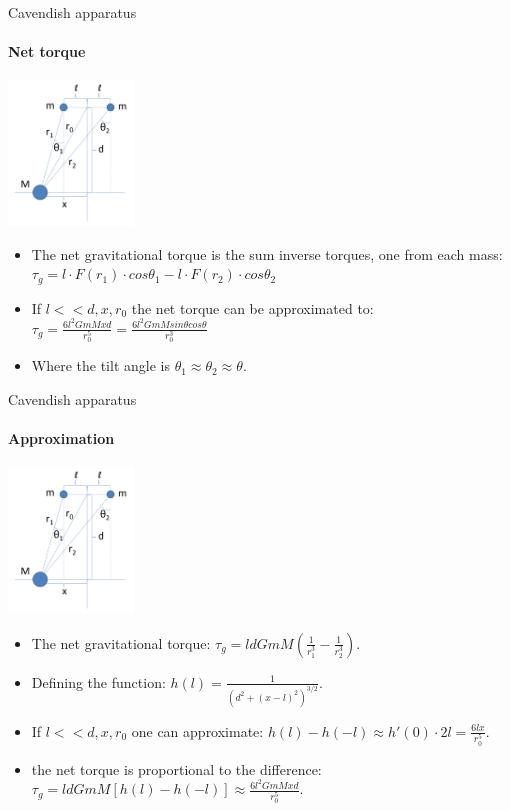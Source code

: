 \documentclass{beamer}
\begin{document}
\begin{frame}{Cavendish apparatus}
\framesubtitle{Net torque}
	\begin{center}		
		\includegraphics[width=0.25\textwidth,keepaspectratio]{Cavendish apparatus.PNG}
    \end{center}
	\begin{itemize}
		\item The net gravitational torque is the sum inverse torques, one from each mass: $\tau_g = l \cdot F(r_1) \cdot cos\theta_1 - l \cdot F(r_2) \cdot cos\theta_2$
		\item If $l<<d,x,r_0$ the net torque can be approximated to: $\tau_g =  \frac{6l^2GmMxd} {r_0^5} = \frac{6l^2GmM sin\theta cos\theta}{r_0^3}$
		\item Where the tilt angle is $\theta_1 \approx \theta_2 \approx \theta$.
	\end{itemize}
\end{frame}
\begin{frame}{Cavendish apparatus}
	\framesubtitle{Approximation}
	\begin{center}		
		\includegraphics[width=0.25\textwidth,keepaspectratio]{Cavendish apparatus.PNG}
    \end{center}
	\begin{itemize}
		\item The net gravitational torque: $\tau_g =  l d GmM(\frac{1}{r_1^3} - \frac{1}{r_2^3})$.
		\item Defining the function: $h(l) = \frac{1}{(d^2 +(x-l)^2)^{3/2}}$.
		\item If $l<<d,x,r_0$ one can approximate: $h(l)-h(-l)\approx h'(0)\cdot 2l = \frac{6lx}{r_0^5}$.
		\item the net torque is proportional to the difference: $\tau_g = l d GmM[h(l)-h(-l)]\approx \frac{6l^2GmMxd} {r_0^5}$.
	\end{itemize}
\end{frame}
\end{document}
